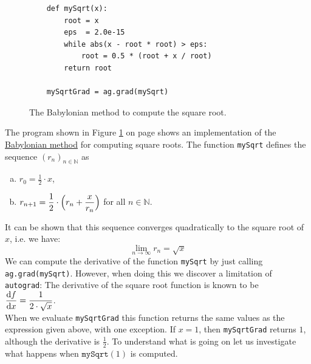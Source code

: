 \begin{figure}[!ht]
\centering
\begin{verbatim}
    def mySqrt(x): 
        root = x
        eps  = 2.0e-15
        while abs(x - root * root) > eps:
            root = 0.5 * (root + x / root)    
        return root

    mySqrtGrad = ag.grad(mySqrt)
\end{verbatim}
\vspace*{-0.3cm}
\caption{The Babylonian method to compute the square root.}
\label{fig:autograd-intro-2.ipynb}
\end{figure}
\noindent
The program shown in Figure \ref{fig:autograd-intro-2.ipynb} on page \pageref{fig:autograd-intro-2.ipynb} shows
an implementation of the
\href{https://en.wikipedia.org/wiki/Methods_of_computing_square_roots#Heron's_method}{Babylonian method} 
for computing square roots.  The function \texttt{mySqrt} defines the sequence $(r_n)_{n\in\mathbb{N}}$ as
\begin{enumerate}[(a)]
\item $\displaystyle r_0 = \frac{ 1}{2} \cdot x$,
\item $\displaystyle r_{n+1} = \frac{1}{2} \cdot \Bigl(r_n + \frac{x}{r_n}\Bigr)$ \quad for all $n \in \mathbb{N}$.
\end{enumerate}
It can be shown that this sequence converges quadratically to the square root of $x$, i.e. we have:
$$ \lim\limits_{n\rightarrow\infty} r_n = \sqrt{x} $$
We can compute the derivative of the function \texttt{mySqrt} by just calling \texttt{ag.grad(mySqrt)}.
However, when doing this we discover a limitation of \texttt{autograd}: The derivative of the square root function is
known to be
\\[0.2cm]
\hspace*{1.3cm}
$ \displaystyle \frac{\mathrm{d} f}{\mathrm{d} x} = \frac{1}{2 \cdot \sqrt{x}}$.
\\[0.2cm]
When we evaluate \texttt{mySqrtGrad} this function returns the same values as the expression given above, with
one exception.  If $x = 1$, then \texttt{mySqrtGrad} returns $1$, although the derivative is $\frac{1}{2}$.
To understand what is going on let us investigate what happens when $\texttt{mySqrt}(1)$ is computed.
